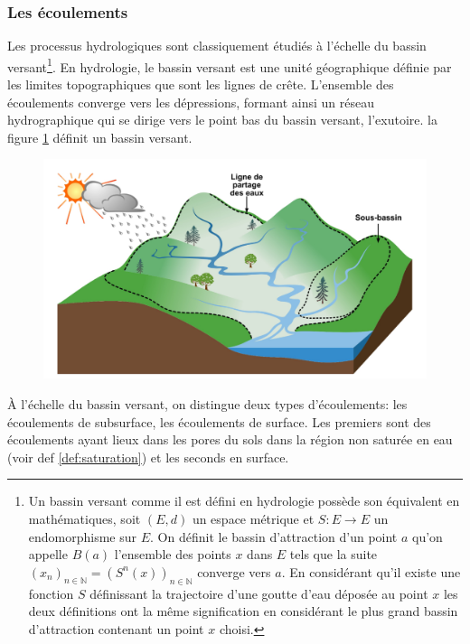 \documentclass[a4paper,11pt]{article}
\numberwithin{equation}{section}
\begin{document}
\subsubsection{Les écoulements}
\label{ch:ecoulement}

Les processus hydrologiques sont classiquement étudiés à l’échelle du bassin versant\footnote{Un bassin versant comme il est défini en hydrologie possède son équivalent en mathématiques, soit $(E,d)$ un espace métrique et $S:E\to E$ un endomorphisme sur $E$. On définit le bassin d'attraction d'un point $a$ qu'on appelle $B(a)$ l'ensemble des points $x$ dans $E$ tels que la suite $(x_n)_{n \in \mathbb{N}}=(S^n(x))_{n \in \mathbb{N}}$ converge vers $a$. En considérant qu'il existe une fonction $S$ définissant la trajectoire d'une goutte d'eau déposée au point $x$ les deux définitions ont la même signification en considérant le plus grand bassin d'attraction contenant un point $x$ choisi.}. En hydrologie, le bassin versant est une unité géographique définie par les limites topographiques que sont les lignes de crête. L’ensemble des écoulements converge vers les dépressions, formant ainsi un réseau hydrographique qui se dirige vers le point bas du bassin versant, l’exutoire. la figure \ref{fig-Bassin versant} définit un bassin versant. 

\begin{figure}[H]
	\begin{center}
		\includegraphics[scale=0.15]{bassin_versant.png}
	\end{center}
	\label{fig-Bassin versant}
\end{figure}

À l’échelle du bassin versant, on distingue deux types d’écoulements: les écoulements de subsurface, les écoulements de surface. Les premiers sont des écoulements ayant lieux dans les pores du sols dans la région non saturée en eau (voir def \ref{def:saturation}) et les seconds en surface.
\end{document}
